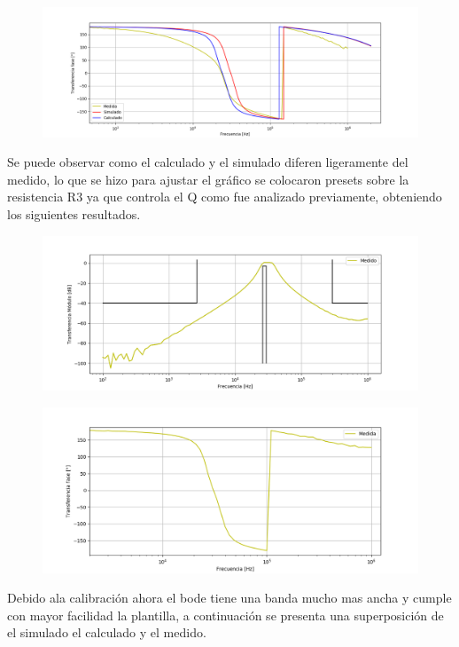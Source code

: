 \begin{figure}[H]
	\centering
	\includegraphics[width=\textwidth]{Imagenes-Ej2/BodeRauchCalcsimF.png}
	\label{fig:Bodecalcsimf}
\end{figure}
Se puede observar como el calculado y el simulado diferen ligeramente del medido, lo que se hizo para ajustar el gráfico se colocaron presets sobre la resistencia R3 ya que controla el Q como fue analizado previamente, obteniendo los siguientes resultados.
\begin{figure}[H]
	\centering
	\includegraphics[width=\textwidth]{Imagenes-Ej2/BodeRauchV2.png}
	\label{fig:graph}
\end{figure}
\begin{figure}[H]
	\centering
	\includegraphics[width=\textwidth]{Imagenes-Ej2/BodeRauchFaseV2.png}
	\label{fig:graph}
\end{figure}
Debido ala calibración ahora el bode tiene una banda mucho mas ancha y cumple con mayor facilidad la plantilla, a continuación se presenta una superposición de el simulado el calculado y el medido.
